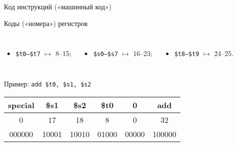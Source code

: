 \begin{frame}{Код инструкций («машинный код»)}



\pause
\begin{block}{Коды («номера») регистров}
\begin{columns}\small
    \column{4cm}
\begin{itemize}
    \item \texttt{\$t0–\$t7} $\mapsto$  8–15;
\end{itemize}
    \column{4cm}
\begin{itemize}
    \item \texttt{\$s0–\$s7} $\mapsto$ 16–23;
\end{itemize}
    \column{4cm}
\begin{itemize}
    \item \texttt{\$t8–\$t9} $\mapsto$ 24–25.
\end{itemize}
\end{columns}
\end{block}


\pause
\begin{columns}
    \column{9.5cm}
\begin{block}{Пример: \texttt{add \$t0, \$s1, \$s2}}
\small
\ttfamily
\begin{tabular}{|c|c|c|c|c|c|}
\hline
special & \$s1 & \$s2 & \$t0 & 0 & add\\
\hline
0 & 17 & 18 & 8 & 0 & 32\\
\hline
000000 & 10001 & 10010 & 01000 & 00000 & 100000\\
\hline
\end{tabular}
\end{block}
    \column{1cm}
\end{columns}


\end{frame}

